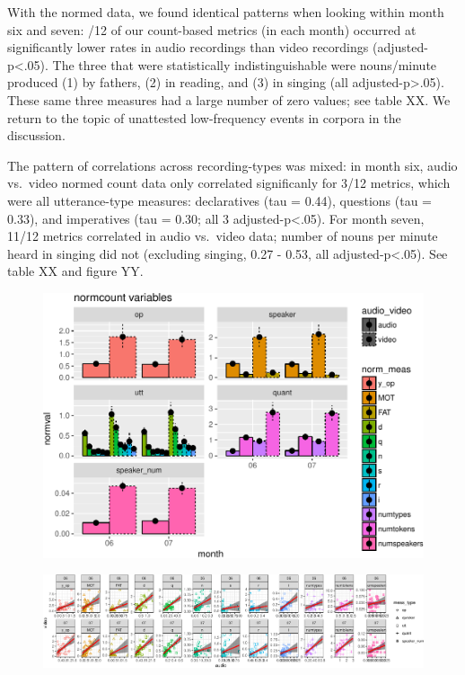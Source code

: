 \documentclass[man]{apa6}
\theoremstyle{definition}
\theoremstyle{definition}
\theoremstyle{definition}
\theoremstyle{remark}
\begin{document}
With the normed data, we found identical patterns when looking within
month six and seven: /12 of our count-based metrics (in each month)
occurred at significantly lower rates in audio recordings than video
recordings (adjusted-p\textless{}.05). The three that were statistically
indistinguishable were nouns/minute produced (1) by fathers, (2) in
reading, and (3) in singing (all adjusted-p\textgreater{}.05). These
same three measures had a large number of zero values; see table XX. We
return to the topic of unattested low-frequency events in corpora in the
discussion.

The pattern of correlations across recording-types was mixed: in month
six, audio vs.~video normed count data only correlated significanly for
3/12 metrics, which were all utterance-type measures: declaratives (tau
= 0.44), questions (tau = 0.33), and imperatives (tau = 0.30; all 3
adjusted-p\textless{}.05). For month seven, 11/12 metrics correlated in
audio vs.~video data; number of nouns per minute heard in singing did
not (excluding singing, 0.27 - 0.53, all adjusted-p\textless{}.05). See
table XX and figure YY.

\begin{figure}
\centering
\includegraphics{sixseven_papaja_files/figure-latex/gr_derived_counts_diff-1.pdf}
\caption{}
\end{figure}

\begin{figure}
\centering
\includegraphics{sixseven_papaja_files/figure-latex/gr_derived_counts_corr-1.pdf}
\caption{}
\end{figure}
\end{document}
